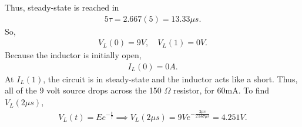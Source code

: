 \documentclass{report}
\begin{document}
\begin{itemize}
            Thus, steady-state is reached in 
            \begin{align*}
                5\tau = 2.667(5) = 13.33\mu s
            .\end{align*}
            So,
            \begin{align*}
                V_{L}(0) = 9V, \quad V_{L}(1) = 0V
            .\end{align*}
            Because the inductor is initially open, 
            \begin{align*}
                I_{L}(0) = 0A
            .\end{align*}
            At $I_{L}(1)$, the circuit is in steady-state and the inductor acts like a short. Thus, all of the 9 volt source drops across the 150 $\Omega$ resistor, for 60mA.
            \bigbreak \noindent 
            To find $V_{L}(2\mu s)$,
            \begin{align*}
                V_{L}(t) = Ee^{-\frac{t}{\tau}} \implies V_{L}(2\mu s) = 9Ve^{-\frac{2\mu s}{2.667\mu s}} = 4.251V
            .\end{align*}

    \end{itemize}
\end{document}
